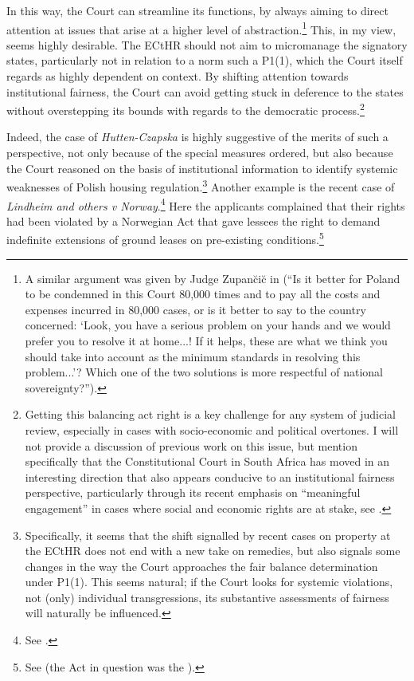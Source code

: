 In this way, the Court can streamline its functions, by always aiming to direct attention at issues that arise at a higher level of abstraction.\footnote{A similar argument was given by Judge Zupan\u{c}i\u{c} in \cite{hutten06} (``Is it better for Poland to be condemned in this Court 80,000 times and to pay all the costs and expenses incurred in 80,000 cases, or is it better to say to the country concerned: `Look, you have a serious problem on your hands and we would prefer you to resolve it at home...! If it helps, these are what we think you should take into account as the minimum standards in resolving this problem...'? Which one of the two solutions is more respectful of national sovereignty?'').} This, in my view, seems highly desirable. The ECtHR should not aim to micromanage the signatory states, particularly not in relation to a norm such a P1(1), which the Court itself regards as highly dependent on context. By shifting attention towards institutional fairness, the Court can avoid getting stuck in deference to the states without overstepping its bounds with regards to the democratic process.\footnote{Getting this balancing act right is a key challenge for any system of judicial review, especially in cases with socio-economic and political overtones. I will not provide a  discussion of previous work on this issue, but mention specifically that the Constitutional Court in South Africa has moved in an interesting direction that also appears conducive to an institutional fairness perspective, particularly through its recent emphasis on ``meaningful engagement'' in cases where social and economic rights are at stake, see \cite{pillay12}.}

Indeed, the case of {\it Hutten-Czapska} is highly suggestive of the merits of such a perspective, not only because of the special measures ordered, but also because the Court reasoned on the basis of institutional information to identify systemic weaknesses of Polish housing regulation.\footnote{Specifically, it seems that the shift signalled by recent cases on property at the ECtHR does not end with a new take on remedies, but also signals some changes in the way the Court approaches the fair balance determination under P1(1). This seems natural; if the Court looks for systemic violations, not (only) individual transgressions, its substantive assessments of fairness will naturally be influenced.} Another example is the recent case of {\it Lindheim and others v Norway}.\footnote{See \cite{lindheim12}.} Here the applicants complained that their rights had been violated by a Norwegian Act that gave lessees the right to demand indefinite extensions of ground leases on pre-existing conditions.\footnote{See \cite[119]{lindheim12} (the Act in question was the \cite{gla96}).}

